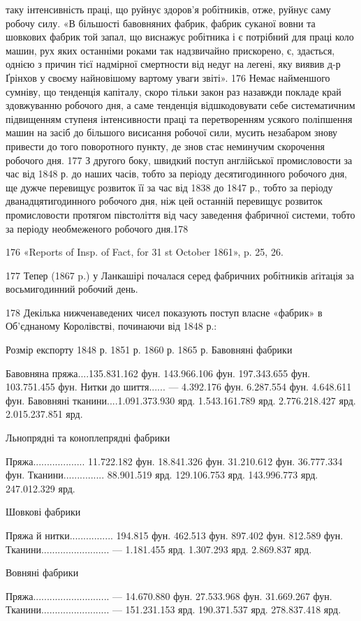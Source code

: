 таку інтенсивність праці, що руйнує здоров’я робітників, отже,
руйнує саму робочу силу. «В більшості бавовняних фабрик, фабрик
суканої вовни та шовкових фабрик той запал, що виснажує
робітника і є потрібний для праці коло машин, рух яких останніми
роками так надзвичайно прискорено, є, здається, однією
з причин тієї надмірної смертности від недуг на легені, яку виявив
д-р Ґрінхов у своєму найновішому вартому уваги звіті». 176
Немає найменшого сумніву, що тенденція капіталу, скоро тільки
закон раз назавжди покладе край здовжуванню робочого дня,
а саме тенденція відшкодовувати себе систематичним підвищенням
ступеня інтенсивности праці та перетворенням усякого поліпшення
машин на засіб до більшого висисання робочої сили, мусить
незабаром знову привести до того поворотного пункту, де знов
стає неминучим скорочення робочого дня. 177 З другого боку,
швидкий поступ англійської промисловости за час від 1848 р. до
наших часів, тобто за періоду десятигодинного робочого дня, ще
дужче перевищує розвиток її за час від 1838 до 1847 р., тобто за
періоду дванадцятигодинного робочого дня, ніж цей останній
перевищує розвиток промисловости протягом півстоліття від часу
заведення фабричної системи, тобто за періоду необмеженого
робочого дня.178

176 «Reports of Insp. of Fact, for 31 st October 1861», p. 25, 26.

177    Тепер (1867 p.) у Ланкашірі почалася серед фабричних робітників
аґітація за восьмигодинний робочий день.

178    Декілька нижченаведених чисел показують поступ власне «фабрик»
в Об’єднаному Королівстві, починаючи від 1848 р.:

                                                                                        Розмір
експорту
                                                             1848 р.               1851 р.          
        1860 р.                 1865 р.
Бавовняні фабрики

Бавовняна пряжа....135.831.162 фун.   143.966.106 фун.  197.343.655 фун. 103.751.455 фун.
Нитки до шиття......                      —                 4.392.176 фун.    6.287.554 фун.   
4.648.611 фун.
Бавовняні тканини....1.091.373.930 ярд.  1.543.161.789 ярд.    2.776.218.427 ярд.    2.015.237.851
ярд.

Льнопрядні та коноплепрядні фабрики

Пряжа...................  11.722.182 фун.    18.841.326 фун.    31.210.612 фун.    36.777.334 фун.
Тканини...............  88.901.519 ярд.    129.106.753 ярд.    143.996.773 ярд.    247.012.329 ярд.

Шовкові фабрики

Пряжа й нитки................  194.815 фун.    462.513 фун.      897.402 фун.         812.589 фун.
Тканини.........................              —             1.181.455 ярд.    1.307.293 ярд.   
2.869.837 ярд.

Вовняні фабрики

Пряжа............................               —       14.670.880 фун.    27.533.968 фун.   
31.669.267 фун.
Тканини.........................              —     151.231.153 ярд.    190.371.537 ярд.   
278.837.418 ярд.
